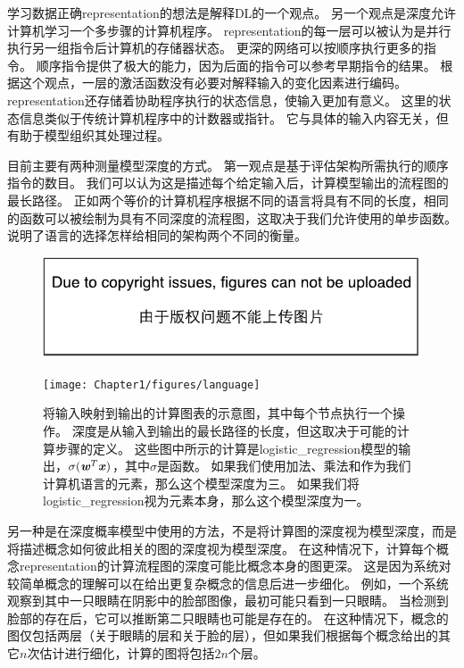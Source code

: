 学习数据正确\gls{representation}的想法是解释\gls{DL}的一个观点。
另一个观点是深度允许计算机学习一个多步骤的计算机程序。
\gls{representation}的每一层可以被认为是并行执行另一组指令后计算机的存储器状态。
更深的网络可以按顺序执行更多的指令。
顺序指令提供了极大的能力，因为后面的指令可以参考早期指令的结果。
根据这个观点，一层的激活函数没有必要对解释输入的变化因素进行编码。
\gls{representation}还存储着协助程序执行的状态信息，使输入更加有意义。
这里的状态信息类似于传统计算机程序中的计数器或指针。
它与具体的输入内容无关，但有助于模型组织其处理过程。


目前主要有两种测量模型深度的方式。
第一观点是基于评估架构所需执行的顺序指令的数目。
我们可以认为这是描述每个给定输入后，计算模型输出的流程图的最长路径。
正如两个等价的计算机程序根据不同的语言将具有不同的长度，相同的函数可以被绘制为具有不同深度的流程图，这取决于我们允许使用的单步函数。
说明了语言的选择怎样给相同的架构两个不同的衡量。
\begin{figure}[!htb]
\ifOpenSource
\centerline{\includegraphics{figure.pdf}}
\else
\centerline{\texttt{[image: Chapter1/figures/language]}}
\fi
\caption{将输入映射到输出的计算图表的示意图，其中每个节点执行一个操作。
深度是从输入到输出的最长路径的长度，但这取决于可能的计算步骤的定义。
这些图中所示的计算是\gls{logistic_regression}模型的输出，$\sigma(\boldsymbol{\mathit{w}}^T \boldsymbol{\mathit{x}})$，其中$\sigma$是函数。
如果我们使用加法、乘法和作为我们计算机语言的元素，那么这个模型深度为三。
如果我们将\gls{logistic_regression}视为元素本身，那么这个模型深度为一。
}
\label{fig:chap1_language}
\end{figure}

另一种是在深度概率模型中使用的方法，不是将计算图的深度视为模型深度，而是将描述概念如何彼此相关的图的深度视为模型深度。
在这种情况下，计算每个概念\gls{representation}的计算流程图的深度可能比概念本身的图更深。
这是因为系统对较简单概念的理解可以在给出更复杂概念的信息后进一步细化。
例如，一个系统观察到其中一只眼睛在阴影中的脸部图像，最初可能只看到一只眼睛。
当检测到脸部的存在后，它可以推断第二只眼睛也可能是存在的。
在这种情况下，概念的图仅包括两层（关于眼睛的层和关于脸的层），但如果我们根据每个概念给出的其它$n$次估计进行细化，计算的图将包括$2n$个层。

